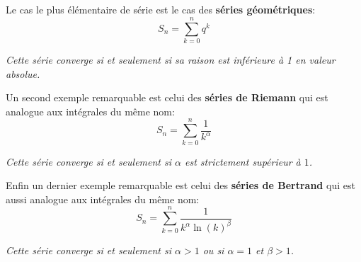 \subsection*{}
Le cas le plus élémentaire de série est le cas des \textbf{séries géométriques}:
\[
   S_n = \sum_{k=0}^{n} q^k
\]
\begin{center}
   \textit{Cette série converge si et seulement si sa raison est inférieure à 1 en valeur absolue.}
\end{center}

Un second exemple remarquable est celui des \textbf{séries de Riemann} qui est analogue aux intégrales du même nom:
\[
   S_n = \sum_{k=0}^{n} \frac{1}{k^\alpha}
\]
\begin{center}
   \textit{Cette série converge si et seulement si \(\alpha\) est strictement supérieur à \(1\).}
\end{center}

Enfin un dernier exemple remarquable est celui des \textbf{séries de Bertrand} qui est aussi analogue aux intégrales du même nom:
\[
   S_n = \sum_{k=0}^{n} \frac{1}{k^\alpha \ln(k)^\beta}
\]
\begin{center}
   \textit{Cette série converge si et seulement si \(\alpha > 1\) ou si \(\alpha = 1\) et \(\beta > 1\).}
\end{center}
